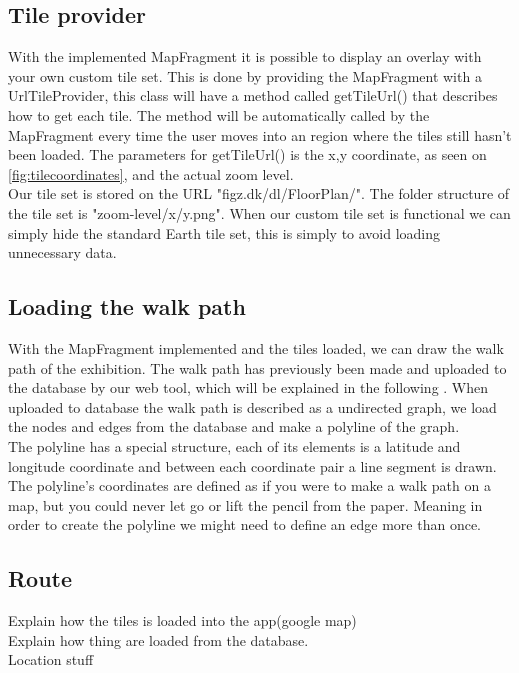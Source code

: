 \subsection*{Tile provider}
With the implemented MapFragment it is possible to display an overlay with your own custom tile set. This is done by providing the MapFragment with a UrlTileProvider\citep{tilecoordinates}, this class will have a method called getTileUrl() that describes how to get each tile. The method will be automatically called by the MapFragment every time the user moves into an region where the tiles still hasn't been loaded. The parameters for getTileUrl() is the x,y coordinate, as seen on \autoref{fig:tilecoordinates}, and the actual zoom level.\\
Our tile set is stored on the URL "figz.dk/dl/FloorPlan/". The folder structure of the tile set is "zoom-level/x/y.png". When our custom tile set is functional we can simply hide the standard Earth tile set, this is simply to avoid loading unnecessary data. 
\subsection*{Loading the walk path}
With the MapFragment implemented and the tiles loaded, we can draw the walk path of the exhibition. The walk path has previously been made and uploaded to the database by our web tool, which will be explained in the following . When uploaded to database the walk path is described as a undirected graph, we load the nodes and edges from the database and make a polyline of the graph.\\ 
The polyline has a special structure, each of its elements is a latitude and longitude coordinate and between each coordinate pair a line segment is drawn. The polyline's coordinates are defined as if you were to make a walk path on a map, but you could never let go or lift the pencil from the paper. Meaning in order to create the polyline we might need to define an edge more than once.
\subsection*{Route}

Explain how the tiles is loaded into the app(google map)\\
Explain how thing are loaded from the database.\\
Location stuff






	
